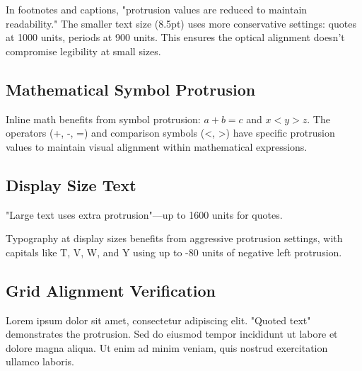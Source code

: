 \documentclass{article}
\begin{document}
\footnotesize
In footnotes and captions, "protrusion values are reduced to maintain readability." The smaller text size (8.5pt) uses more conservative settings: quotes at 1000 units, periods at 900 units. This ensures the optical alignment doesn't compromise legibility at small sizes.
\normalsize

\subsection{Mathematical Symbol Protrusion}

Inline math benefits from symbol protrusion: $a + b = c$ and $x < y > z$. The operators (+, -, =) and comparison symbols (<, >) have specific protrusion values to maintain visual alignment within mathematical expressions.

\subsection{Display Size Text}

{\Large "Large text uses extra protrusion"---up to 1600 units for quotes.}

{\huge T}ypography at display sizes benefits from aggressive protrusion settings, with capitals like T, V, W, and Y using up to -80 units of negative left protrusion.

\subsection{Grid Alignment Verification}

\showgrid

Lorem ipsum dolor sit amet, consectetur adipiscing elit. "Quoted text" demonstrates the protrusion. Sed do eiusmod tempor incididunt ut labore et dolore magna aliqua. Ut enim ad minim veniam, quis nostrud exercitation ullamco laboris.
\end{document}
